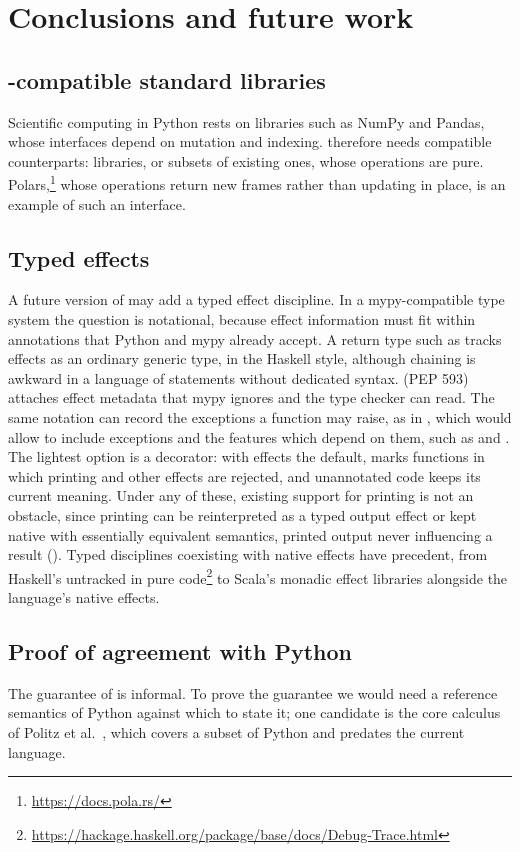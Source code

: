 \section{Conclusions and future work}
\label{sec:conclusion}

\subsection{\PurePy-compatible standard libraries}

Scientific computing in Python rests on libraries such as NumPy and Pandas, whose interfaces depend on
mutation and indexing. \PurePy therefore needs compatible counterparts: libraries, or subsets of existing
ones, whose operations are pure. Polars,\footnote{\url{https://docs.pola.rs/}} whose operations return new frames rather than
updating in place, is an example of such an interface.

\subsection{Typed effects}

A future version of \PurePy may add a typed effect discipline. In a mypy-compatible type system the
question is notational, because effect information must fit within annotations that Python and mypy
already accept. A return type such as  tracks effects as an ordinary generic type, in
the Haskell style, although chaining is awkward in a language of statements without dedicated syntax.
 (PEP 593) attaches effect metadata that mypy ignores and the \PurePy
type checker can read. The same notation can record the exceptions a function may raise, as in
, which would allow \PurePy to include exceptions and the features which
depend on them, such as  and . The lightest option is a decorator: with effects the default,  marks functions in
which printing and other effects are rejected, and unannotated code keeps its current meaning. Under any
of these, existing support for printing is not an obstacle, since printing can be reinterpreted as a typed
output effect or kept native with essentially equivalent semantics, printed output never influencing a
result (). Typed disciplines coexisting with native effects have precedent, from Haskell's
untracked  in pure code\footnote{\url{https://hackage.haskell.org/package/base/docs/Debug-Trace.html}}
to Scala's monadic effect libraries alongside the language's native effects.

\subsection{Proof of agreement with Python}
\label{sec:agreement}

The guarantee of  is informal. To prove the guarantee we would need a reference semantics
of Python against which to state it; one candidate is the core calculus of Politz et al.~\citep{politz2013}, which
covers a subset of Python and predates the current language.
